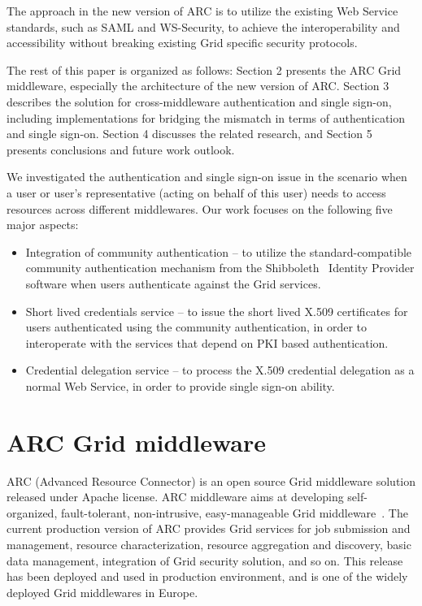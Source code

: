 \documentclass[conference]{IEEEtran}
\begin{document}
The approach in the new version of ARC is to utilize the existing Web Service standards, such as SAML and WS-Security, to achieve the interoperability and accessibility without breaking existing Grid specific security protocols.

The rest of this paper is organized as follows: Section 2 presents the ARC Grid middleware, especially the architecture of the new version of ARC. Section 3 describes the solution for cross-middleware authentication and single sign-on, including implementations for bridging the mismatch in terms of authentication and single sign-on. Section 4 discusses the related research, and Section 5 presents conclusions and future work outlook.

We investigated the authentication and single sign-on issue in the scenario when a user or user's representative (acting on behalf of this user) needs to access resources across different middlewares. Our work focuses on the following five major aspects:
\begin{itemize}
	\item Integration of community authentication -- to utilize the standard-compatible community authentication mechanism from the Shibboleth~\cite{Shiblink} Identity Provider software when users authenticate against the Grid services.
	\item Short lived credentials service -- to issue the short lived X.509 certificates for users authenticated using the community authentication, in order to interoperate with the services that depend on PKI based authentication.
	\item Credential delegation service -- to process the X.509 credential delegation as a normal Web Service, in order to provide single sign-on ability.
\end{itemize}

\section{ARC Grid middleware}
\label{sec:arcmiddleware}

ARC (Advanced Resource Connector) is an open source Grid middleware solution released under Apache license. ARC middleware aims at developing self-organized, fault-tolerant, non-intrusive, easy-manageable Grid middleware~\cite{MEllert07}. The current production version of ARC provides Grid services for job submission and management, resource characterization, resource aggregation and discovery, basic data management, integration of Grid security solution, and so on. This release has been deployed and used in production environment, and is one of the widely deployed Grid middlewares in Europe.
\end{document}
